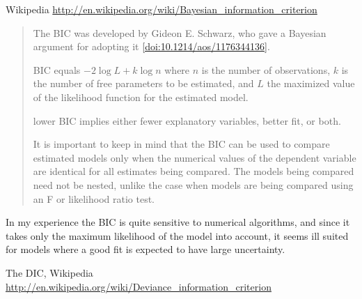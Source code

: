 Wikipedia
\url{http://en.wikipedia.org/wiki/Bayesian_information_criterion}
\begin{quote}
The BIC was developed by Gideon E. Schwarz, who gave a Bayesian
argument for adopting it \ref{doi:10.1214/aos/1176344136}.

BIC equals $-2\log L + k\log n$ where $n$ is the number of observations,
$k$ is the number of free parameters to be estimated, and $L$ the
maximized value of the likelihood function for the estimated model.

lower BIC implies either fewer explanatory variables, better fit, or
both. 

It is important to keep in mind that the BIC can be used to compare
estimated models only when the numerical values of the dependent
variable are identical for all estimates being compared. The models
being compared need not be nested, unlike the case when models are
being compared using an F or likelihood ratio test.
\end{quote}

In my experience the BIC is quite sensitive to numerical algorithms,
and since it takes only the maximum likelihood of the model into
account, it seems ill suited for models where a good fit is expected
to have large uncertainty.

The DIC, Wikipedia
\url{http://en.wikipedia.org/wiki/Deviance_information_criterion}

